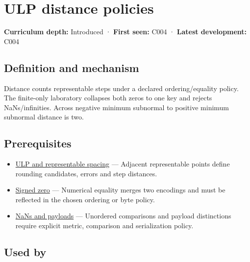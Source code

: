 \hypertarget{appendix-deca299ae4b8}{}\label{referencestart:appendix-deca299ae4b8}
\section{ULP distance policies}\label{appendix-deca299ae4b8-ulp-distance-policies}

\textbf{Curriculum depth:} Introduced · \textbf{First seen:} C004 · \textbf{Latest development:} C004

\begin{allmightroledefinition}

\subsection{Definition and mechanism}\label{appendix-deca299ae4b8-definition-and-mechanism}

Distance counts representable steps under a declared ordering/equality policy. The finite-only laboratory collapses both zeros to one key and rejects NaNs/infinities. Across negative minimum subnormal to positive minimum subnormal distance is two.

\end{allmightroledefinition}

\subsection{Prerequisites}\label{appendix-deca299ae4b8-prerequisites}

\begin{itemize}
\tightlist
\item
  \hyperref[appendix-14bab4cab9d4]{ULP and representable spacing} --- Adjacent representable points define rounding candidates, errors and step distances.
\item
  \hyperref[appendix-3a048f032c1f]{Signed zero} --- Numerical equality merges two encodings and must be reflected in the chosen ordering or byte policy.
\item
  \hyperref[appendix-d6607cc4c235]{NaNs and payloads} --- Unordered comparisons and payload distinctions require explicit metric, comparison and serialization policy.
\end{itemize}

\subsection{Used by}\label{appendix-deca299ae4b8-used-by}

